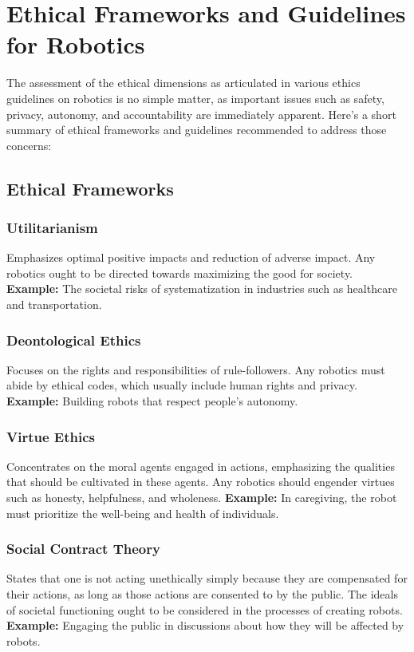 \section{Ethical Frameworks and Guidelines for Robotics}

The assessment of the ethical dimensions as articulated in various ethics guidelines on robotics is no simple matter, as important issues such as safety, privacy, autonomy, and accountability are immediately apparent. Here’s a short summary of ethical frameworks and guidelines recommended to address those concerns:

\subsection{Ethical Frameworks}

\subsubsection{Utilitarianism}
Emphasizes optimal positive impacts and reduction of adverse impact. Any robotics ought to be directed towards maximizing the good for society.  
\textbf{Example:} The societal risks of systematization in industries such as healthcare and transportation.

\subsubsection{Deontological Ethics}
Focuses on the rights and responsibilities of rule-followers. Any robotics must abide by ethical codes, which usually include human rights and privacy.  
\textbf{Example:} Building robots that respect people’s autonomy.

\subsubsection{Virtue Ethics}
Concentrates on the moral agents engaged in actions, emphasizing the qualities that should be cultivated in these agents. Any robotics should engender virtues such as honesty, helpfulness, and wholeness.  
\textbf{Example:} In caregiving, the robot must prioritize the well-being and health of individuals.

\subsubsection{Social Contract Theory}
States that one is not acting unethically simply because they are compensated for their actions, as long as those actions are consented to by the public. The ideals of societal functioning ought to be considered in the processes of creating robots.  
\textbf{Example:} Engaging the public in discussions about how they will be affected by robots.

